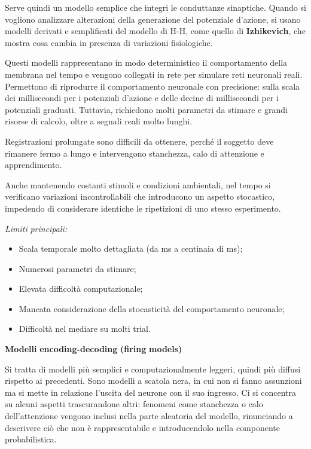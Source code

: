 \documentclass[12pt,a4paper]{book}
\begin{document}
Serve quindi un modello semplice che integri le conduttanze sinaptiche. Quando si vogliono analizzare alterazioni della generazione del potenziale d'azione, si usano modelli derivati e semplificati del modello di H-H, come quello di \textbf{Izhikevich}, che mostra cosa cambia in presenza di variazioni fisiologiche.

Questi modelli rappresentano in modo deterministico il comportamento della membrana nel tempo e vengono collegati in rete per simulare reti neuronali reali. Permettono di riprodurre il comportamento neuronale con precisione: sulla scala dei millisecondi per i potenziali d'azione e delle decine di millisecondi per i potenziali graduati. Tuttavia, richiedono molti parametri da stimare e grandi risorse di calcolo, oltre a segnali reali molto lunghi.

Registrazioni prolungate sono difficili da ottenere, perché il soggetto deve rimanere fermo a lungo e intervengono stanchezza, calo di attenzione e apprendimento.

Anche mantenendo costanti stimoli e condizioni ambientali, nel tempo si verificano variazioni incontrollabili che introducono un aspetto stocastico, impedendo di considerare identiche le ripetizioni di uno stesso esperimento.

\textit{Limiti}\textit{ }\textit{principali:}

\begin{itemize}
  \item Scala temporale molto dettagliata (da ms a centinaia di ms);
  \item Numerosi parametri da stimare;
  \item Elevata difficoltà computazionale;
  \item Mancata considerazione della stocasticità del comportamento neuronale;
  \item Difficoltà nel mediare su molti trial.
\end{itemize}
\textbf{Modelli}\textbf{ }\textbf{encoding-decoding}\textbf{ }\textbf{(firing}\textbf{ }\textbf{models)}

Si tratta di modelli più semplici e computazionalmente leggeri, quindi più diffusi rispetto ai precedenti. Sono modelli a scatola nera, in cui non si fanno assunzioni ma si mette in relazione l'uscita del neurone con il suo ingresso. Ci si concentra su alcuni aspetti trascurandone altri: fenomeni come stanchezza o calo dell'attenzione vengono inclusi nella parte aleatoria del modello, rinunciando a descrivere ciò che non è rappresentabile e introducendolo nella componente probabilistica.
\end{document}
